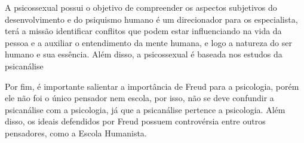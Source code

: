 A psicossexual possui o objetivo de compreender os aspectos subjetivos do desenvolvimento e do psiquismo humano é um direcionador para os especialista, terá a missão identificar conflitos que podem estar influenciando na vida da pessoa e a auxiliar o entendimento da mente humana, e logo a natureza do ser humano e sua essência.
Além disso, a psicossexual é baseada nos estudos da psicanálise~\cite{silva2007psicologia_educacao}

Por fim, é importante salientar a importância de Freud para a psicologia, porém ele não foi o único pensador nem escola, por isso, não se deve confundir a psicanálise com a psicologia, já que a psicanálise pertence a psicologia.
Além disso, os ideais defendidos por Freud possuem controvérsia entre outros pensadores, como a Escola Humanista.
